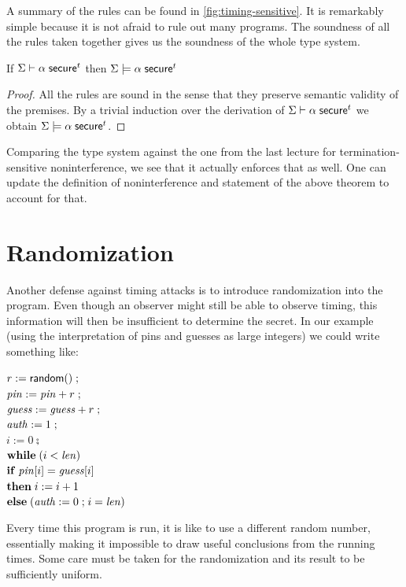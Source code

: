 \documentclass[11pt]{article}
\newcommand{\tm}{t}
\begin{document}
A summary of the rules can be found in \autoref{fig:timing-sensitive}.  It is
remarkably simple because it is not afraid to rule out many programs.  The
soundness of all the rules taken together gives us the soundness of the whole
type system.

\begin{theorem}
  \mbox{}\newline
  If $\Sigma \vdash \alpha\; \ms{secure}^\tm$ then
  $\Sigma \models \alpha\; \ms{secure}^\tm$
\end{theorem}
\begin{proof}
  All the rules are sound in the sense that they preserve semantic validity of
  the premises.  By a trivial induction over the derivation of
  $\Sigma \vdash \alpha\; \ms{secure}^\tm$ we obtain
  $\Sigma \models \alpha\; \ms{secure}^\tm$.
\end{proof}

Comparing the type system against the one from the last lecture for
termination-sensitive noninterference, we see that it actually enforces that as
well.  One can update the definition of noninterference and statement of the
above theorem to account for that.

\section{Randomization}

Another defense against timing attacks is to introduce randomization into the
program.  Even though an observer might still be able to observe timing, this
information will then be insufficient to determine the secret.  In our example
(using the interpretation of pins and guesses as large integers) we could write
something like:
\begin{tabbing}
  \quad $r := \mathsf{random}() \mathrel{;}$ \\
  \quad $\mathit{pin} := \mathit{pin} + r \mathrel{;}$ \\
  \quad $\mathit{guess} := \mathit{guess} + r \mathrel{;}$ \\
  \quad $\mathit{auth} := 1 \mathrel{;}$ \\
  \quad $i := 0 \semi$ \\
  \quad $\mathbf{while}\; (i < \mathit{len})$ \\
  \qquad $\mathbf{if}\; \mathit{pin}[i] = \mathit{guess}[i]$ \\
  \qquad $\mathbf{then}\; i := i+1$ \\
  \qquad $\mathbf{else}\; (\mathit{auth} := 0 \mathrel{;} i = \mathit{len})$
\end{tabbing}
Every time this program is run, it is like to use a different random number,
essentially making it impossible to draw useful conclusions from the running
times.  Some care must be taken for the randomization and its result to be
sufficiently uniform.
\end{document}
